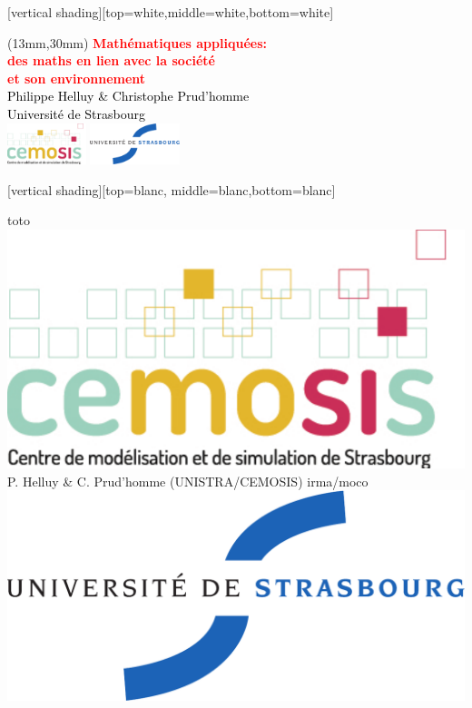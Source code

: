 \documentclass[slideopt,A4]{beamer}
\begin{document}
[vertical shading][top=white,middle=white,bottom=white]



\begin{frame}

\begin{textblock*}{15cm}(13mm,30mm)
{\textcolor{red} {
{\huge\bf Mathématiques appliquées: }\\[2mm]
{\huge\bf  des maths en lien avec la société}\\[2mm]
{\huge\bf   et son environnement}\\[8mm] }}
{\textcolor{black} {
   	{\Large Philippe Helluy \& Christophe Prud'homme}\\[2mm]
	{\Large Université de Strasbourg}\\[2mm]
 
 \includegraphics[height=1.2cm]{LOGOS/logoCemosis}	\hspace*{40mm}	
 \includegraphics[height=1.2cm]{LOGOS/logoUDS} 
	\\
	}
	}
	\end{textblock*}

\end{frame}



[vertical shading][top=blanc, middle=blanc,bottom=blanc]


{
\begin{beamercolorbox}[wd=1\paperwidth,ht=15.5pt]{toto}
\hspace{-1.6mm}	
  \raisebox{1.2ex}
  {  \includegraphics[height=.6cm]{LOGOS/logoCemosis}}
  \raisebox{2.5ex}
 { P. Helluy \& C. Prud'homme (UNISTRA/CEMOSIS)  }
\hspace{\fill}	
  \raisebox{2.5ex}
 { irma/moco }
  \raisebox{1ex}
{  \includegraphics[height=.6cm]{LOGOS/logoUDS}}
\end{beamercolorbox} 
}
\end{document}
